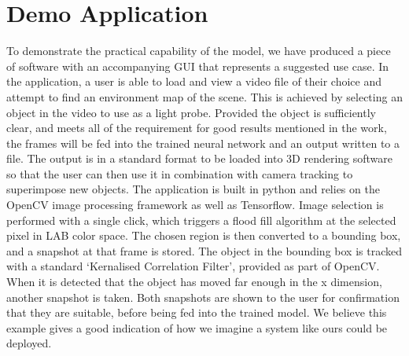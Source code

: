 \documentclass[ %
                    author={Gavin Parker},
                supervisor={Dr. Neill Campbell},
                    degree={MEng},
                     title={Deep Learning for Illumination Estimation from Stereo Images},
                  subtitle={},
                      type={Research},
                      year={2018} ]{dissertation}
\begin{document}
\appendix

\chapter{Demo Application}
To demonstrate the practical capability of the model, we have produced a piece of software with an accompanying GUI that represents a suggested use case. In the application, a user is able to load and view a video file of their choice and attempt to find an environment map of the scene. This is achieved by selecting an object in the video to use as a light probe. Provided the object is sufficiently clear, and meets all of the requirement for good results mentioned in the work, the frames will be fed into the trained neural network and an output written to a file. The output is in a standard format to be loaded into 3D rendering software so that the user can then use it in combination with camera tracking to superimpose new objects.
\newline
The application is built in python and relies on the OpenCV image processing framework as well as Tensorflow. Image selection is performed with a single click, which triggers a flood fill algorithm at the selected pixel in LAB color space. The chosen region is then converted to a bounding box, and a snapshot at that frame is stored. The object in the bounding box is tracked with a standard `Kernalised Correlation Filter', provided as part of OpenCV. When it is detected that the object has moved far enough in the x dimension, another snapshot is taken. Both snapshots are shown to the user for confirmation that they are suitable, before being fed into the trained model. We believe this example gives a good indication of how we imagine a system like ours could be deployed.
\label{appx:example}



\end{document}
